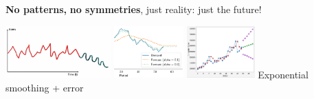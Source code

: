 \documentclass[10pt]{beamer}
\begin{document}
\begin{frame}{\textbf{No patterns,} \textbf{no symmetries}, just reality: just the future!}
\begin{center}
\includegraphics[height=20mm,scale=1.5]{img_2/1.png}
\includegraphics[height=20mm,scale=1.5]{img_2/2.png}
\includegraphics[height=20mm,scale=1.5]{img_2/3.png}
Exponential smoothing + error
\end{center}
\end{frame}
\end{document}
